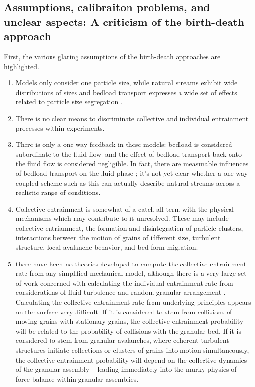 \subsection{Assumptions, calibraiton problems, and unclear aspects: A criticism of the birth-death approach} 


First, the various glaring assumptions of the birth-death approaches are highlighted. 
\begin{enumerate}
	\item Models only consider one particle size, while natural streams exhibit wide distributions of sizes and bedload transport expresses a wide set of effects related to particle size segregation \citep{Wilcock2003, Parker1982, Chen2008}. 
	\item There is no clear means to discriminate collective and individual entrainment processes within experiments. 
	\item There is only a one-way feedback in these models: bedload is considered subordinate to the fluid flow, and the effect of bedload transport back onto the fluid flow is considered negligible. In fact, there are measurable influences of bedload transport on the fluid phase \citep{}; it's not yet clear whether a one-way coupled scheme such as this can actually describe natural streams across a realistic range of conditions. 
	\item Collective entrainment is somewhat of a catch-all term with the physical mechanisms which may contribute to it unresolved. These may include collective entrianment, the formation and disintegration of particle clusters, interactions between the motion of grains of idfferent size, turbulent structure, local avalanche behavior, and bed form migration. 
	\item there have been no theories developed to compute the collective entrainment rate from any simplified mechanical model, although there is a very large set of work concerned with calculating the individual entrainment rate from considerations of fluid turbulence and random granular arrangement \citep{Einstein1949, Einstein1950, Grass1970, Paintal1971, Cheng1998, Wu2004, Dey2008, Tregnaghi2012, Dey2018}. Calculating the collective entrainment rate from underlying principles appears on the surface very difficult. If it is considered to stem from collisions of moving grains with stationary grains, the collective entrainment probability will be related to the probability of collisions with the granular bed. If it is considered to stem from granular avalanches, where coherent turbulent structures initiate collections or clusters of grains into motion simultaneously, the collective entrainment probability will depend on the collective dynamics of the granular assembly -- leading immediately into the murky physics of force balance within granular assemblies.

\end{enumerate}
